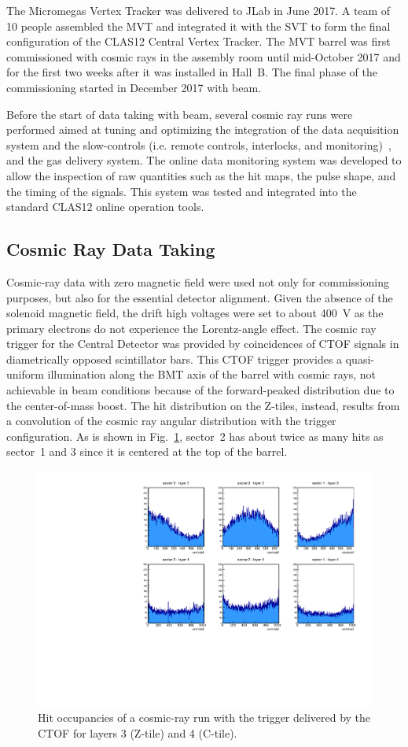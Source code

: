 The Micromegas Vertex Tracker was delivered to JLab in June 2017. A team of 10 people assembled the MVT and integrated
it with the SVT to form the final configuration of the CLAS12 Central Vertex Tracker. The MVT barrel was first commissioned
with cosmic rays in the assembly room until mid-October 2017 and for the first two weeks after it was installed in Hall~B. The
final phase of the commissioning started in December 2017 with beam.

Before the start of data taking with beam, several cosmic ray runs were performed aimed at tuning and optimizing the
integration of the data acquisition system and the slow-controls (i.e. remote controls, interlocks, and 
monitoring)~\cite{daq-nim},
and the gas delivery system. The online data monitoring system was developed to allow the inspection of raw quantities such as the
hit maps, the pulse shape, and the timing of the signals. This system was tested and integrated into the standard CLAS12
online operation tools. 

\subsection{Cosmic Ray Data Taking}
\label{sec:cosmics}

Cosmic-ray data with zero magnetic field were used not only for commissioning purposes, but also for the essential detector
alignment. Given the absence of the solenoid magnetic field, the drift high voltages were set to about 400~V as the primary
electrons do not experience the Lorentz-angle effect. The cosmic ray trigger for the Central Detector was provided by
coincidences of CTOF signals in diametrically opposed scintillator bars. This CTOF trigger provides a quasi-uniform
illumination along the BMT axis of the barrel with cosmic rays, not achievable in beam conditions because of the forward-peaked
distribution due to the center-of-mass boost. The hit distribution on the Z-tiles, instead, results from a convolution of the cosmic
ray angular distribution with the trigger configuration. As is shown in Fig.~\ref{fig:mm-cosmic_occupancy}, sector~2 has about
twice as many hits as sector~1 and 3 since it is centered at the top of the barrel.

\begin{figure}[htb]
 \includegraphics[width=.45\textwidth]{images/BMT_hit_cosmics_CTOFtrigger.pdf}
 \caption{Hit occupancies of a cosmic-ray run with the trigger delivered by the CTOF for layers 3 (Z-tile) and 4 (C-tile).}
 \label{fig:mm-cosmic_occupancy}
\end{figure}

